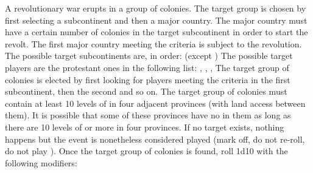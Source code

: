 A revolutionary war erupts in a group of colonies. The target group is chosen
by first selecting a subcontinent and then a major country. The major country
must have a certain number of colonies in the target subcontinent in order to
start the revolt. The first major country meeting the criteria is subject to
the revolution.
\aparag The possible target subcontinents are, in order:
\bparag {}
\bparag {}
\bparag \continentBrazil
\bparag \continentIndia
\bparag \continentAsia (except \continentIndia)
\aparag \label{pVII:IW:Protestant} The possible target players are the
protestant ones in the following list:
\bparag \ENG, \FRA, \HIS, \HOL
\aparag The target group of colonies is elected by first looking for players
meeting the criteria in the first subcontinent, then the second and so on.
\aparag The target group of colonies must contain at least 10 levels of \COL
in four adjacent provinces (with land access between them).
\bparag It is possible that some of these provinces have no \COL in them as
long as there are 10 levels of \COL or more in four provinces.
\aparag If no target exists, nothing happens but the event is nonetheless
considered played (mark off, do not re-roll, do not play \RD).
\aparag Once the target group of colonies is found, roll 1d10 with the
following modifiers:



